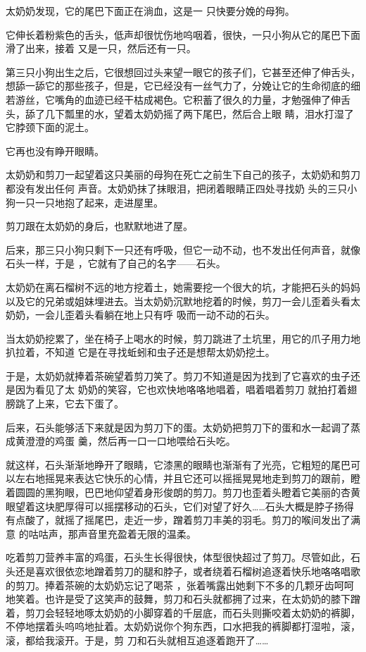 \documentclass{article}
\begin{document}
太奶奶发现，它的尾巴下面正在淌血，这是一
只快要分娩的母狗。 

它伸长着粉紫色的舌头，低声却很忧伤地呜咽着，很快，一只小狗从它的尾巴下面滑了出来，接着
又是一只，然后还有一只。 

第三只小狗出生之后，它很想回过头来望一眼它的孩子们，它甚至还伸了伸舌头，想舔一舔它的那些孩子，但是，它已经没有一丝气力了，分娩让它的生命彻底的细若游丝，它嘴角的血迹已经干枯成褐色。它积蓄了很久的力量，才勉强伸了伸舌头，舔了几下瓢里的水，望着太奶奶摇了两下尾巴，然后合上眼
睛，泪水打湿了它脖颈下面的泥土。 


它再也没有睁开眼睛。 

太奶奶和剪刀一起望着这只美丽的母狗在死亡之前生下自己的孩子，太奶奶和剪刀都没有发出任何
\newpage
声音。太奶奶抹了抹眼泪，把闭着眼睛正四处寻找奶
头的三只小狗一只一只地抱了起来，走进屋里。 


剪刀跟在太奶奶的身后，也默默地进了屋。 

后来，那三只小狗只剩下一只还有呼吸，但它一动不动，也不发出任何声音，就像石头一样，于是
，它就有了自己的名字——石头。 

太奶奶在离石榴树不远的地方挖着土，她需要挖一个很大的坑，才能把石头的妈妈以及它的兄弟或姐妹埋进去。当太奶奶沉默地挖着的时候，剪刀一会儿歪着头看太奶奶，一会儿歪着头看躺在地上只有呼
吸而一动不动的石头。 

当太奶奶挖累了，坐在椅子上喝水的时候，剪刀跳进了土坑里，用它的爪子用力地扒拉着，不知道
它是在寻找蚯蚓和虫子还是想帮太奶奶挖土。 

于是，太奶奶就捧着茶碗望着剪刀笑了。剪刀不知道是因为找到了它喜欢的虫子还是因为看见了太
\newpage
奶奶的笑容，它也欢快地咯咯地唱着，唱着唱着剪刀
就拍打着翅膀跳了上来，它去下蛋了。 

后来，石头能够活下来就是因为剪刀下的蛋。太奶奶把剪刀下的蛋和水一起调了蒸成黄澄澄的鸡蛋
羹，然后再一口一口地喂给石头吃。 

就这样，石头渐渐地睁开了眼睛，它漆黑的眼睛也渐渐有了光亮，它粗短的尾巴可以左右地摇晃来表达它快乐的心情，并且它还可以摇摇晃晃地走到剪刀的跟前，瞪着圆圆的黑狗眼，巴巴地仰望着身形俊朗的剪刀。剪刀也歪着头瞪着它美丽的杏黄眼望着这块肥厚得可以摇摆移动的石头，它们对望了好久……石头大概是脖子扬得有点酸了，就摇了摇尾巴，走近一步，蹭着剪刀丰美的羽毛。剪刀的喉间发出了满意
的咕咕声，那声音里充盈着无限的温柔。 

吃着剪刀营养丰富的鸡蛋，石头生长得很快，体型很快超过了剪刀。尽管如此，石头还是喜欢很依恋地蹭着剪刀的腿和脖子，或者绕着石榴树追逐着快乐地咯咯唱歌的剪刀。捧着茶碗的太奶奶忘记了喝茶
\newpage
，张着嘴露出她剩下不多的几颗牙齿呵呵地笑着。也许是受了这笑声的鼓舞，剪刀和石头就都拥了过来，在太奶奶的膝下蹭着，剪刀会轻轻地啄太奶奶的小脚穿着的千层底，而石头则撕咬着太奶奶的裤脚，不停地摆着头呜呜地扯着。太奶奶说你个狗东西，口水把我的裤脚都打湿啦，滚，滚，都给我滚开。于是，剪
刀和石头就相互追逐着跑开了…… 
\end{document}
